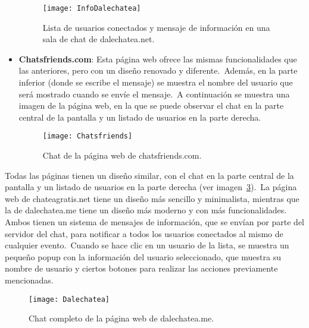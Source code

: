 \begin{itemize}
	\begin{figure}[H]
		\centering
		\hspace{1.5cm}
		\texttt{[image: InfoDalechatea]}
		\caption{Lista de usuarios conectados y mensaje de información en una sala de chat de dalechatea.net.}
		\label{fig:UsuariosEInfoDalechatea}
	\end{figure}

	\item \textbf{Chatsfriends.com}: Esta página web ofrece las mismas funcionalidades que las anteriores, pero
	con un diseño renovado y diferente.\ Además, en la parte inferior (donde se escribe el mensaje) se muestra
	el nombre del usuario que será mostrado cuando se envíe el mensaje.\ A continuación se muestra una imagen
	de la página web, en la que se puede observar el chat en la parte central de la pantalla y un listado de
	usuarios en la parte derecha.

	\begin{figure}[H]
		\centering
		\texttt{[image: Chatsfriends]}
		\caption{Chat de la página web de chatsfriends.com.}
		\label{fig:Chatsfriends}
	\end{figure}
\end{itemize}
\label{itm:estadoDelArte}

Todas las páginas tienen un diseño similar, con el chat en la parte central de la pantalla y un listado de usuarios
en la parte derecha (ver imagen~\ref{fig:chatCompleto}).\ La página web de chateagratis.net tiene un diseño más
sencillo y minimalista, mientras que la de dalechatea.me tiene un diseño más moderno y con más funcionalidades.
Ambos tienen un sistema de mensajes de información, que se envían por parte del servidor del chat, para notificar a
todos los usuarios conectados al mismo de cualquier evento.\ Cuando se hace clic en un usuario de la lista, se
muestra un pequeño popup con la información del usuario seleccionado, que muestra su nombre de usuario y ciertos
botones para realizar las acciones previamente mencionadas.


\begin{figure}[H]
	\centering
	\texttt{[image: Dalechatea]}
	\caption{Chat completo de la página web de dalechatea.me.}
	\label{fig:chatCompleto}
\end{figure}


